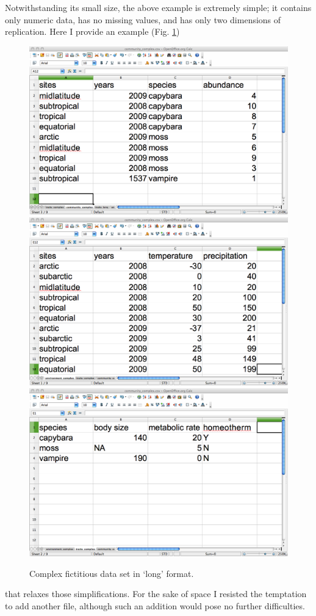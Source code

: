 \documentclass{article}
\numberwithin{exercise}{section}
\begin{document}
Notwithstanding its small size, the above example is extremely simple; it contains only numeric data, has no missing values, and has only two dimensions of replication.  Here I provide an example (Fig. \ref{fig:complexspreadsheet}) \begin{figure}
\includegraphics{./readingmultipletables/community_complex.png}
\includegraphics{./readingmultipletables/environment_complex.png}
\includegraphics{./readingmultipletables/traits_complex.png}
\caption{Complex fictitious data set in `long' format.}
\label{fig:complexspreadsheet}
\end{figure}that relaxes those simplifications.  For the sake of space I resisted the temptation to add another file, although such an addition would pose no further difficulties.
\end{document}
